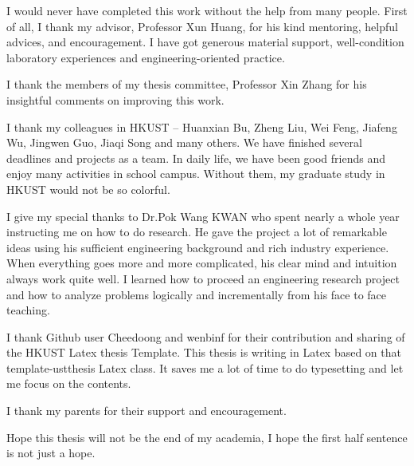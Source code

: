 \acknowledgments
I would never have completed this work without the help from many people. First of all, I thank my advisor, Professor Xun Huang, for his kind mentoring, helpful advices, and encouragement. I have got generous material support, well-condition laboratory experiences and engineering-oriented practice.  

I thank the members of my thesis committee, Professor Xin Zhang for his insightful comments on improving this work. 

I thank my colleagues in HKUST -- Huanxian Bu, Zheng Liu, Wei Feng, Jiafeng Wu, Jingwen Guo, Jiaqi Song and many others. We have finished several deadlines and projects as a team. In daily life, we have been good friends and enjoy many activities in school campus. Without them, my graduate study in HKUST would not be so colorful. 

I give my special thanks to Dr.Pok Wang KWAN who spent nearly a whole year instructing me on how to do research. He gave the project a lot of remarkable ideas using his sufficient engineering background and rich industry experience. When everything goes more and more complicated, his clear mind and intuition always work quite well. I learned how to proceed an engineering research project and how to analyze problems logically and incrementally from his face to face teaching.

I thank Github user Cheedoong and wenbinf for their contribution and sharing of the HKUST Latex thesis Template. This thesis is writing in Latex based on that template-ustthesis Latex class. It saves me a lot of time to do typesetting and let me focus on the contents.   

I thank my parents for their support and encouragement. 

Hope this thesis will not be the end of my academia, I hope the first half sentence is not just a hope.

\endacknowledgments
